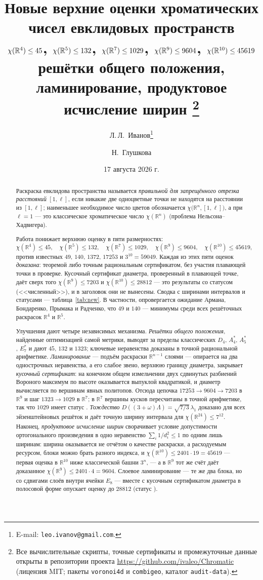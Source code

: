 \documentclass[11pt]{article}
\title{\bfseries Новые верхние оценки хроматических чисел
евклидовых пространств\\[2pt]
\large $\chi(\R^4)\le45$,\; $\chi(\R^5)\le132$,\; $\chi(\R^7)\le1029$,\;
$\chi(\R^9)\le9604$,\; $\chi(\R^{10})\le45619$\\[4pt]
\normalsize\mdseries решётки общего положения, ламинирование,
продуктовое исчисление ширин%
\thanks{Все вычислительные скрипты, точные сертификаты и промежуточные данные
открыты в репозитории проекта \url{https://github.com/ivaleo/Chromatic}
(лицензия MIT; пакеты \texttt{voronoi4d} и \texttt{combigeo}, каталог
\texttt{audit-data}).}}
\author{Л.\,Л.~Иванов\thanks{E-mail: \texttt{leo.ivanov@gmail.com}.}
  \and Н.~Глушкова}
\date{17 августа 2026 г.}
\theoremstyle{definition}
\theoremstyle{remark}
\newcommand{\R}{\mathbb{R}}
\newcommand{\cyrbadge}[1]{{\fontencoding{T2A}\selectfont #1}}
\newcommand{\stC}{\textcolor{RoyalBlue}{\textbf{\cyrbadge{[С]}}}}       %
\newcommand{\stN}{\textcolor{BurntOrange}{\textbf{\cyrbadge{[Ч]}}}}     %
\begin{document}
\maketitle


\begin{abstract}
\noindent
Раскраска евклидова пространства называется \emph{правильной для запрещённого
отрезка расстояний} $[1,\ell]$, если никакие две одноцветные точки не находятся
на расстоянии из $[1,\ell]$; наименьшее необходимое число цветов обозначается
$\chi\bigl(\R^n,[1,\ell]\bigr)$, а при $\ell=1$ --- это классическое
хроматическое число $\chi(\R^n)$ (проблема Нельсона--Хадвигера).

Работа понижает верхнюю оценку в пяти размерностях:
\[
\chi(\R^4)\le45,\quad \chi(\R^5)\le132,\quad \chi(\R^7)\le1029,\quad
\chi(\R^9)\le9604,\quad \chi(\R^{10})\le45619,
\]
против известных $49$, $140$, $1372$, $17253$ и $3^{10}=59049$. Каждая из этих
пяти оценок \emph{доказана}: теоремой либо точным рациональным сертификатом,
без участия плавающей точки в проверке. Кусочный сертификат диаметра,
проверенный в плавающей точке, даёт сверх того $\chi(\R^9)\le7203$ и
$\chi(\R^{10})\le28812$ --- это результаты со статусом \stN{}
(<<численный>>), и в заголовок они не вынесены. Сводка с ширинами
интервалов и статусами --- таблица~\ref{tab:new}. В частности,
опровергается ожидание Армана, Бондаренко, Прымака и Радченко, что $49$ и $140$
--- минимумы среди всех решёточных раскрасок $\R^4$ и $\R^5$.

Улучшения дают четыре независимых механизма. \emph{Решётки общего положения},
найденные оптимизацией самой метрики, выводят за пределы классических $D_4$,
$A_4^*$, $A_5^*$, $E_7^*$ и дают $45$, $132$ и $1323$; ключевые неравенства
доказаны в точной рациональной арифметике. \emph{Ламинирование} --- подъём
раскраски $\R^{n-1}$ слоями --- опирается на два однострочных неравенства, а его
слабое звено, верхнюю границу диаметра, закрывает \emph{кусочный сертификат}: на
конечном общем измельчении двух сдвинутых разбиений Вороного максимум по высоте
оказывается выпуклой квадратикой, и диаметр вычисляется по вершинам явных
политопов. Отсюда цепочка $17253\to9604\to7203$ в $\R^9$ и шаг $1323\to1029$
в $\R^7$; в $\R^7$ вершины кусков пересчитаны в точной арифметике, так что
$1029$ имеет статус \stC. \emph{Тождество} $D((3+\omega)\Lambda)=
\sqrt{7/3}\,\lambda_1$ доказано для всех эйзенштейновых решёток и даёт точную
ширину интервала для $\chi(\R^{24})\le7^{12}$. Наконец, \emph{продуктовое исчисление ширин}
сворачивает условие допустимости ортогонального произведения в одно неравенство
$\sum_i 1/d_i^2\le1$ по одним лишь ширинам: ширина оказывается не отчётом о
качестве раскраски, а расходуемым ресурсом, блоки можно брать разного индекса, и
$\chi(\R^{10})\le2401\cdot19=45619$ --- первая оценка в $\R^{10}$ ниже
классической башни $3^n$, --- а в $\R^9$ тот же счёт даёт доказанное
$\chi(\R^9)\le2401\cdot4=9604$. Слоевое ламинирование --- те же два блока,
но со сдвигами слоёв внутри ячейки $E_8$ --- вместе с кусочным сертификатом
диаметра в полосовой форме опускает оценку до $28812$ (статус \stN).


\end{abstract}
\end{document}
